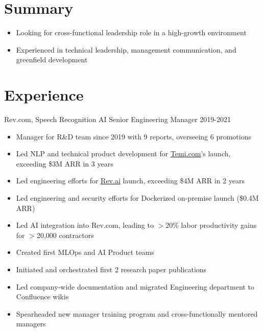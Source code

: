 \documentclass[line,margin]{res}
\begin{document}
    \address{\href{mailto:jdong42@gmail.com}{jdong42@gmail.com}}
    \address{\href{tel:15127759524}{(512) 775-9524}}
\begin{resume}

\vspace{-8pt}
\section{Summary}
    \vspace{22pt}
        \begin{itemize} \itemsep -2pt
        \item Looking for cross-functional leadership role in a high-growth environment
        \item Experienced in technical leadership, management communication, and greenfield development
        \end{itemize}

\vspace{-8pt}
\section{Experience} 
    \vspace{12pt}
    Rev.com, Speech Recognition AI Senior Engineering Manager
    \hfill  2019-2021
        \begin{itemize} \itemsep -2pt
        \item Manager for R\&D team since 2019 with 9 reports, overseeing 6 promotions
        \item Led NLP and technical product development for \href{https://temi.com}{Temi.com}'s launch, exceeding \$3M ARR in 3 years
        \item Led engineering efforts for \href{https://rev.ai}{Rev.ai} launch, exceeding \$4M ARR in 2 years
        \item Led engineering and security efforts for Dockerized on-premise launch (\$0.4M ARR)
        \item Led AI integration into Rev.com, leading to $>$20\% labor productivity gains for $>$20,000 contractors
        \item Created first MLOps and AI Product teams
        \item Initiated and orchestrated first 2 research paper publications
        \item Led company-wide documentation and migrated Engineering department to Confluence wikis
        \item Spearheaded new manager training program and cross-functionally mentored managers
        \end{itemize}
        

\end{resume}
\end{document}
